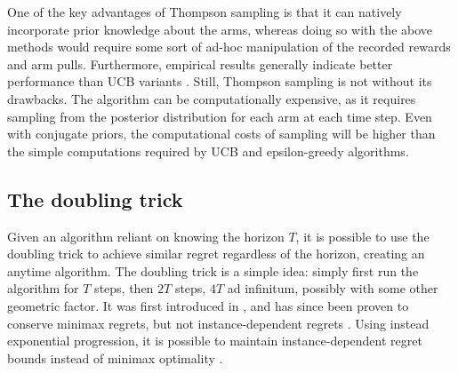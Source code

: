 One of the key advantages of Thompson sampling is that it can natively incorporate prior knowledge about the arms, whereas doing so with the above methods would require some sort of ad-hoc manipulation of the recorded rewards and arm pulls.
Furthermore, empirical results generally indicate better performance than UCB variants \autocite{kaufmann2012}.
Still, Thompson sampling is not without its drawbacks.
The algorithm can be computationally expensive, as it requires sampling from the posterior distribution for each arm at each time step.
Even with conjugate priors, the computational costs of sampling will be higher than the simple computations required by UCB and epsilon-greedy algorithms.

\subsection{The doubling trick}
Given an algorithm reliant on knowing the horizon $T$, it is possible to use the doubling trick to achieve similar regret regardless of the horizon, creating an anytime algorithm.
The doubling trick is a simple idea: simply first run the algorithm for $T$ steps, then $2T$ steps, $4T$ ad infinitum, possibly with some other geometric factor.
It was first introduced in \autocite{auer1995}, and has since been proven to conserve minimax regrets, but not instance-dependent regrets \autocite{besson2018}.
Using instead exponential progression, it is possible to maintain instance-dependent regret bounds instead of minimax optimality \autocite{besson2018}.
